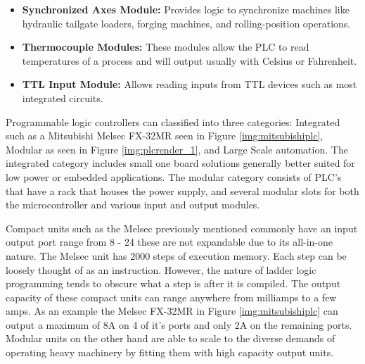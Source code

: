 \begin{itemize}
	\item \textbf{Synchronized Axes Module:} Provides logic to synchronize machines like hydraulic tailgate loaders, forging machines, and rolling-position operations.
	\item \textbf{Thermocouple Modules:} These modules allow the PLC to read temperatures of a process and will output usually with Celsius or Fahrenheit.
	\item \textbf{TTL Input Module:} Allows reading inputs from TTL devices such as most integrated circuits.
\end{itemize}

Programmable logic controllers can classified into three categories: Integrated such as a Mitsubishi Melsec FX-32MR seen in Figure \ref{img:mitsubishiplc}, Modular as seen in Figure \ref{img:plcrender_1}, and Large Scale automation. The integrated category includes small one board solutions generally better suited for low power or embedded applications. The modular category consists of PLC's that have a rack that houses the power supply, and several modular slots for both the microcontroller and various input and output modules.

Compact units such as the Melsec previously mentioned commonly have an input output port range from 8 - 24 these are not expandable due to its all-in-one nature. The Melsec unit has 2000 steps of execution memory. Each step can be loosely thought of as an instruction. However, the nature of ladder logic programming tends to obscure what a step is after it is compiled. The output capacity of these compact units can range anywhere from milliamps to a few amps. As an example the Melsec FX-32MR in Figure \ref{img:mitsubishiplc} can output a maximum of 8A on 4 of it's ports and only 2A on the remaining ports. Modular units on the other hand are able to scale to the diverse demands of operating heavy machinery by fitting them with high capacity output units.

